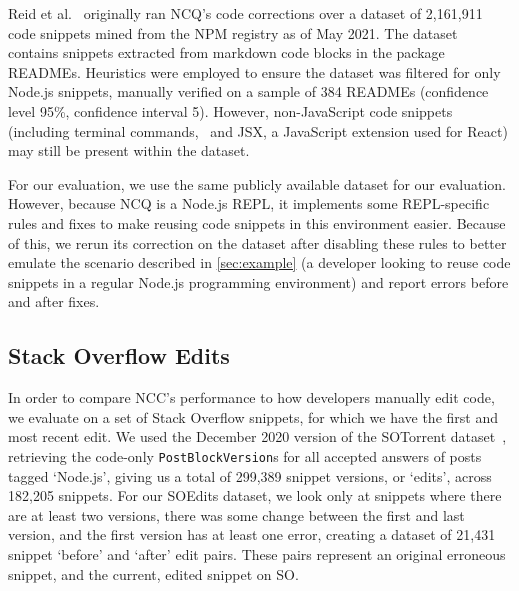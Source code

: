 \documentclass[conference]{IEEEtran}
\begin{document}
Reid et al.~\cite{reidNCQ} originally ran NCQ's code corrections over a dataset of 2,161,911 code snippets mined from the NPM registry as of May 2021. The dataset contains snippets extracted from markdown code blocks in the package READMEs. Heuristics were employed to ensure the dataset was filtered for only Node.js snippets, manually verified on a sample of 384 READMEs (confidence level 95\%, confidence interval 5). However, non-JavaScript code snippets (including terminal commands, \ts\ and JSX, a JavaScript extension used for React) may still be present within the dataset.

For our evaluation, we use the same publicly available dataset for our evaluation. However, because NCQ is a Node.js REPL, it implements some REPL-specific rules and fixes to make reusing code snippets in this environment easier. Because of this, we rerun its correction on the dataset after disabling these rules to better emulate the scenario described in \autoref{sec:example} (a developer looking to reuse code snippets in a regular Node.js programming environment) and report errors before and after fixes.


\subsection{Stack Overflow Edits}
\label{sec:so_edits}

In order to compare NCC's performance to how developers manually edit code, we evaluate on a set of Stack Overflow snippets, for which we have the first and most recent edit. We used the December 2020 version of the SOTorrent dataset~\cite{DBLP:conf/msr/BaltesDT008, baltes2020annotated}, retrieving the code-only \texttt{PostBlockVersion}s for all accepted answers of posts tagged `Node.js', giving us a total of 299,389 snippet versions, or `edits', across 182,205 snippets. For our SOEdits dataset, we look only at snippets where there are at least two versions, there was some change between the first and last version, and the first version has at least one error, creating a dataset of 21,431 snippet `before' and `after' edit pairs. These pairs represent an original erroneous snippet, and the current, edited snippet on SO.
\end{document}
